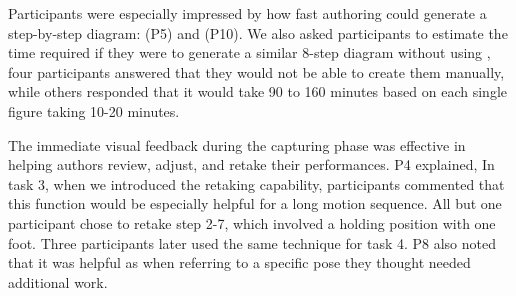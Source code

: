 Participants were especially impressed by how fast authoring could generate a step-by-step diagram:
 (P5) and
 (P10).
%
We also asked participants to estimate the time required if they were to generate a similar 8-step diagram without using \systemname{}, four participants answered that they would not be able to create them manually, while others responded that it would take 90 to 160 minutes based on each single figure taking 10-20 minutes.
%

The immediate visual feedback during the capturing phase was effective in helping authors review, adjust, and retake their performances.
P4 explained, 
In task 3, when we introduced the retaking capability, participants commented that this function would be especially helpful for a long motion sequence. All but one participant chose to retake step 2-7, which involved a holding position with one foot. %
Three participants later used the same technique for task 4. P8 also noted that it was helpful as  when referring to a specific pose they thought needed additional work.


